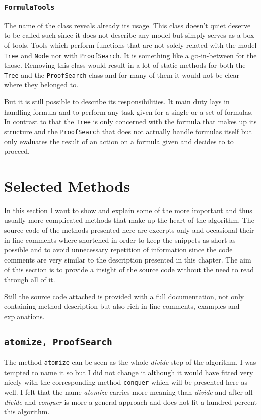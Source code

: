 \subsubsection[FormulaTools]{\texttt{FormulaTools}}
The name of the class reveals already its usage. This class doesn't quiet deserve to be called such since it does not describe any model but simply serves as a box of tools. Tools which perform functions that are not solely related with the model \texttt{Tree} and \texttt{Node} nor with \texttt{ProofSearch}. It is something like a go-in-between for the those. Removing this class would result in a lot of static methods for both the \texttt{Tree} and the \texttt{ProofSearch} class and for many of them it would not be clear where they belonged to. 

But it is still possible to describe its responsibilities. It main duty lays in handling formula and to perform any task given for a single or a set of formulas. In contrast to that the \texttt{Tree} is only concerned with the formula that makes up its structure and the \texttt{ProofSearch} that does not actually handle formulas itself but only evaluates the result of an action on a formula given and decides to to proceed.


\section{Selected Methods}
In this section I want to show and explain some of the more important and thus usually more complicated methods that make up the heart of the algorithm. The source code of the methods presented here are excerpts only and occasional their in line comments where shortened in order to keep the snippets as short as possible and to avoid unnecessary repetition of information since the code comments are very similar to the description presented in this chapter. The aim of this section is to provide a insight of the source code without the need to read through all of it. 

Still the source code attached  is provided with a full documentation, not only containing method description but also rich in line comments, examples and explanations. 

\subsection[atomize]{\texttt{atomize, ProofSearch}}
The method \texttt{atomize} can be seen as the whole \emph{divide} step of the algorithm. I was tempted to name it so but I did not change it although it would have fitted very nicely with the corresponding method \texttt{conquer} which will be presented here as well. I felt that the name \emph{atomize} carries more meaning than \emph{divide} and after all \emph{divide} and \emph{conquer} is more a general approach and does not fit a hundred percent this algorithm.

